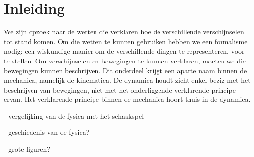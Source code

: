\chapter*{Inleiding}

We zijn opzoek naar de wetten die verklaren hoe de verschillende verschijnselen tot stand komen. Om die wetten te kunnen gebruiken hebben we een formalisme nodig: een wiskundige manier om de verschillende dingen te representeren, voor te stellen. Om verschijnselen en bewegingen te kunnen verklaren, moeten we die bewegingen kunnen beschrijven. Dit onderdeel krijgt een aparte naam binnen de mechanica, namelijk de kinematica. De dynamica houdt zicht enkel bezig met het beschrijven van bewegingen, niet met het onderliggende verklarende principe ervan. Het verklarende principe binnen de mechanica hoort thuis in de dynamica.

- vergelijking van de fysica met het schaakspel

- geschiedenis van de fysica?

- grote figuren?
